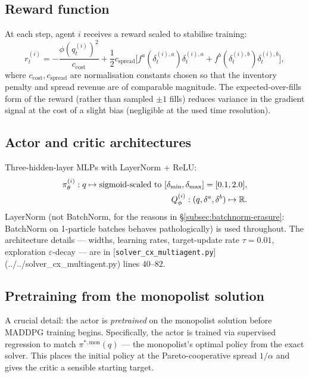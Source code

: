 \subsection{Reward function}

At each step, agent $i$ receives a reward scaled to stabilise training:
\begin{equation}
  r^{(i)}_t = -\frac{\phi (q^{(i)}_t)^2}{c_\text{cost}} + \frac{1}{2} c_\text{spread} \bigl[f^a(\delta^{(i), a}_t) \delta^{(i), a}_t + f^b(\delta^{(i), b}_t) \delta^{(i), b}_t\bigr],
\end{equation}
where $c_\text{cost}, c_\text{spread}$ are normalisation constants chosen so that the inventory penalty and spread revenue are of comparable magnitude. The expected-over-fills form of the reward (rather than sampled $\pm 1$ fills) reduces variance in the gradient signal at the cost of a slight bias (negligible at the used time resolution).

\subsection{Actor and critic architectures}

Three-hidden-layer MLPs with LayerNorm + ReLU:
\begin{align}
  \pi^{(i)}_\theta: q \mapsto \text{sigmoid-scaled to } [\delta_{\min}, \delta_{\max}] = [0.1, 2.0], \\
  Q^{(i)}_\phi: (q, \delta^a, \delta^b) \mapsto \mathbb{R}.
\end{align}
LayerNorm (not BatchNorm, for the reasons in \S\ref{subsec:batchnorm-erasure}: BatchNorm on 1-particle batches behaves pathologically) is used throughout. The architecture details --- widths, learning rates, target-update rate $\tau = 0.01$, exploration $\varepsilon$-decay --- are in [\texttt{solver\_cx\_multiagent.py}](../../solver_cx_multiagent.py) lines 40--82.

\subsection{Pretraining from the monopolist solution}
\label{subsec:pretraining}

A crucial detail: the actor is \emph{pretrained} on the monopolist solution before MADDPG training begins. Specifically, the actor is trained via supervised regression to match $\pi^{*, \text{mon}}(q)$ --- the monopolist's optimal policy from the exact solver. This places the initial policy at the Pareto-cooperative spread $1/\alpha$ and gives the critic a sensible starting target.

